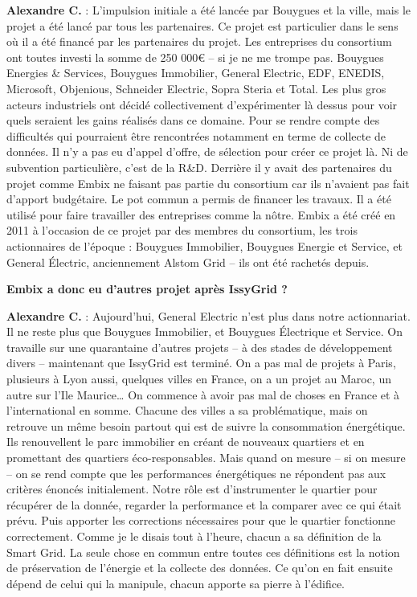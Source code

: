 \textbf{Alexandre C.} :
L’impulsion initiale a été lancée par Bouygues et la ville, mais le projet a été lancé par tous les partenaires.
Ce projet est particulier dans le sens où il a été financé par les partenaires du projet.
Les entreprises du consortium ont toutes investi la somme de 250 000€ – si je ne me trompe pas.
Bouygues Energies \& Services, Bouygues Immobilier, General Electric, EDF, ENEDIS, Microsoft, Objenious, Schneider Electric, Sopra Steria et Total.
Les plus gros acteurs industriels ont décidé collectivement d’expérimenter là dessus pour voir quels seraient les gains réalisés dans ce domaine.
Pour se rendre compte des difficultés qui pourraient être rencontrées notamment en terme de collecte de données.
Il n’y a pas eu d’appel d’offre, de sélection pour créer ce projet là.
Ni de subvention particulière, c’est de la R\&D.
Derrière il y avait des partenaires du projet comme Embix ne faisant pas partie du consortium car ils n'avaient pas fait d’apport budgétaire.
Le pot commun a permis de financer les travaux. Il a été utilisé pour faire travailler des entreprises comme la nôtre.
Embix a été créé en 2011 à l’occasion de ce projet par des membres du consortium,
les trois actionnaires de l’époque : Bouygues Immobilier, Bouygues Energie et Service, et General Électric,
anciennement Alstom Grid – ils ont été rachetés depuis.

\textbf{Embix a donc eu d'autres projet après IssyGrid ?}

\textbf{Alexandre C.} :
Aujourd’hui, General Electric n’est plus dans notre actionnariat. Il ne reste plus que Bouygues Immobilier, et Bouygues Électrique et Service.
On travaille sur une quarantaine d'autres projets – à des stades de développement divers – maintenant que IssyGrid est terminé.
On a pas mal de projets à Paris, plusieurs à Lyon aussi, quelques villes en France, on a un projet au Maroc, un autre sur l’Ile Maurice\dots
On commence à avoir pas mal de choses en France et à l’international en somme.
Chacune des villes a sa problématique, mais on retrouve un même besoin partout qui est de suivre la consommation énergétique.
Ils renouvellent le parc immobilier en créant de nouveaux quartiers et en promettant des quartiers éco-responsables.
Mais quand on mesure – si on mesure – on se rend compte que les performances énergétiques ne répondent pas aux critères énoncés initialement.
Notre rôle est d’instrumenter le quartier pour récupérer de la donnée, regarder la performance et la comparer avec ce qui était prévu.
Puis apporter les corrections nécessaires pour que le quartier fonctionne correctement.
Comme je le disais tout à l’heure, chacun a sa définition de la Smart Grid.
La seule chose en commun entre toutes ces définitions est la notion de préservation de l’énergie et la collecte des données.
Ce qu’on en fait ensuite dépend de celui qui la manipule, chacun apporte sa pierre à l’édifice.

